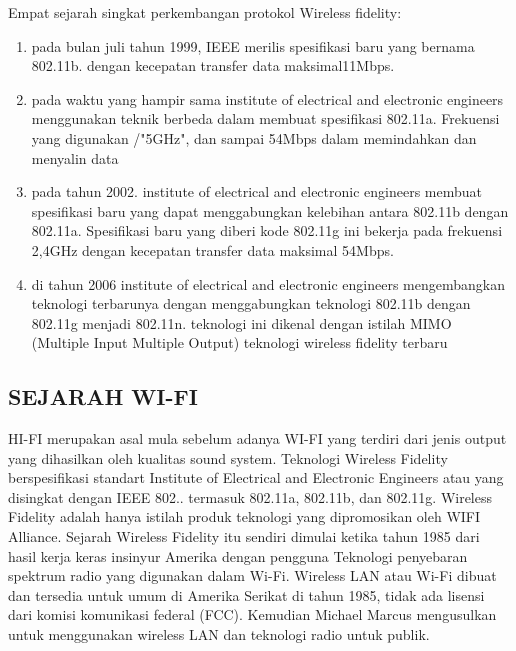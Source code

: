 Empat sejarah singkat perkembangan protokol Wireless fidelity:
\begin{enumerate}

\item pada bulan juli tahun 1999, IEEE merilis spesifikasi baru yang bernama 802.11b. dengan kecepatan transfer data maksimal11Mbps.

\item pada waktu yang hampir sama institute of electrical and electronic engineers menggunakan teknik berbeda dalam membuat spesifikasi 
802.11a. Frekuensi yang  digunakan /"5GHz", dan sampai 54Mbps dalam memindahkan dan menyalin data

\item pada tahun 2002. institute of electrical and electronic engineers membuat spesifikasi baru yang dapat menggabungkan kelebihan antara 
802.11b dengan 802.11a. Spesifikasi baru yang diberi kode 802.11g ini bekerja pada frekuensi 2,4GHz dengan kecepatan transfer data 
maksimal 54Mbps.

\item di tahun 2006 institute of electrical and electronic engineers mengembangkan teknologi terbarunya dengan menggabungkan teknologi 
802.11b dengan 802.11g menjadi 802.11n. teknologi ini dikenal dengan istilah MIMO (Multiple Input Multiple Output) teknologi wireless 
fidelity terbaru
 \end{enumerate}
\subsection {SEJARAH WI-FI}
HI-FI merupakan asal mula sebelum adanya WI-FI yang terdiri dari jenis output yang dihasilkan oleh kualitas sound system. Teknologi Wireless Fidelity berspesifikasi standart Institute of Electrical and Electronic Engineers atau yang disingkat dengan IEEE 802.. termasuk 802.11a, 802.11b, dan 802.11g. Wireless Fidelity adalah hanya istilah produk teknologi yang dipromosikan oleh WIFI Alliance.
Sejarah Wireless Fidelity itu sendiri dimulai ketika tahun 1985 dari hasil kerja keras insinyur Amerika dengan pengguna Teknologi penyebaran spektrum radio yang digunakan dalam Wi-Fi. Wireless LAN atau Wi-Fi dibuat dan tersedia untuk umum di Amerika Serikat di tahun 1985, tidak ada lisensi dari komisi komunikasi federal (FCC). Kemudian Michael Marcus mengusulkan untuk menggunakan wireless LAN dan teknologi radio untuk publik.

